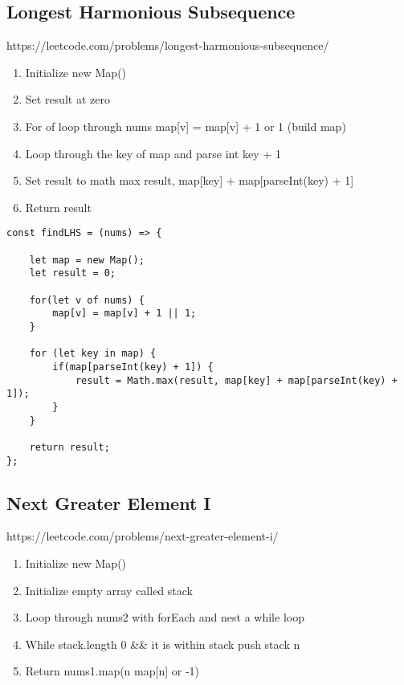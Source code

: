 \documentclass[10pt]{article}
\begin{document}
\pagebreak %
\medskip   
\subsection{Longest Harmonious Subsequence}
https://leetcode.com/problems/longest-harmonious-subsequence/

\begin{enumerate}
	\item Initialize new Map()
	\item Set result at zero 
	\item For of loop through nums map[v] = map[v] + 1 or 1 (build map)
	\item Loop through the key of map and parse int key + 1
	\item Set result to math max result, map[key] + map[parseInt(key) + 1]
	\item Return result
	
\end{enumerate}

\begin{lstlisting}[title=Solution findLHS, captionpos=t]
const findLHS = (nums) => {
    
    let map = new Map(); 
    let result = 0;
    
    for(let v of nums) {
        map[v] = map[v] + 1 || 1;
    }
    
    for (let key in map) {
        if(map[parseInt(key) + 1]) {
            result = Math.max(result, map[key] + map[parseInt(key) + 1]);
        }
    }
    
    return result;
};
\end{lstlisting}

\medskip %





\pagebreak %
\medskip   
\subsection{Next Greater Element I}
https://leetcode.com/problems/next-greater-element-i/

\begin{enumerate}
	\item Initialize new Map()
	\item Initialize empty array called stack 
	\item Loop through nums2 with forEach and nest a while loop
	\item While stack.length  0 \&\& it is within stack push stack n 
	\item Return nums1.map(n map[n] or -1)
\end{enumerate}
\end{document}
